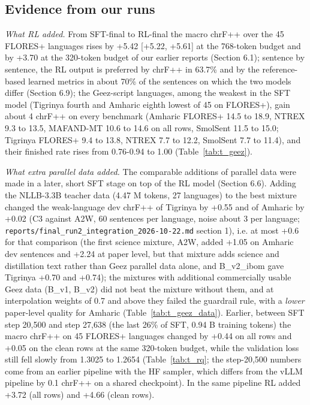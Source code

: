 \subsection{Evidence from our runs}\label{evidence-from-our-runs}

\emph{What RL added.} From SFT-final to RL-final the macro chrF++ over the 45 FLORES+ languages rises by +5.42 {[}+5.22, +5.61{]} at the 768-token budget and by +3.70 at the 320-token budget of our earlier reports (Section 6.1); sentence by sentence, the RL output is preferred by chrF++ in 63.7\% and by the reference-based learned metrics in about 70\% of the sentences on which the two models differ (Section 6.9); the Ge\textquotesingle ez-script languages, among the weakest in the SFT model (Tigrinya fourth and Amharic eighth lowest of 45 on FLORES+), gain about 4 chrF++ on every benchmark (Amharic FLORES+ 14.5 to 18.9, NTREX 9.3 to 13.5, MAFAND-MT 10.6 to 14.6 on all rows, SmolSent 11.5 to 15.0; Tigrinya FLORES+ 9.4 to 13.8, NTREX 7.7 to 12.2, SmolSent 7.7 to 11.4), and their finished rate rises from 0.76-0.94 to 1.00 (Table~\ref{tab:t_geez}).

\emph{What extra parallel data added.} The comparable additions of parallel data were made in a later, short SFT stage on top of the RL model (Section 6.6). Adding the NLLB-3.3B teacher data (4.47 M tokens, 27 languages) to the best mixture changed the weak-language dev chrF++ of Tigrinya by +0.55 and of Amharic by +0.02 (C3 against A2W, 60 sentences per language, noise about 3 per language; \texttt{reports/final\_run2\_integration\_2026-10-22.md} section 1), i.e. at most +0.6 for that comparison (the first science mixture, A2W, added +1.05 on Amharic dev sentences and +2.24 at paper level, but that mixture adds science and distillation text rather than Ge\textquotesingle ez parallel data alone, and B\_v2\_ibom gave Tigrinya +0.70 and +0.74); the mixtures with additional commercially usable Ge\textquotesingle ez data (B\_v1, B\_v2) did not beat the mixture without them, and at interpolation weights of 0.7 and above they failed the guardrail rule, with a \emph{lower} paper-level quality for Amharic (Table~\ref{tab:t_geez_data}). Earlier, between SFT step 20,500 and step 27,638 (the last 26\% of SFT, 0.94 B training tokens) the macro chrF++ on 45 FLORES+ languages changed by +0.44 on all rows and +0.05 on the clean rows at the same 320-token budget, while the validation loss still fell slowly from 1.3025 to 1.2654 (Table~\ref{tab:t_rq}; the step-20,500 numbers come from an earlier pipeline with the HF sampler, which differs from the vLLM pipeline by 0.1 chrF++ on a shared checkpoint). In the same pipeline RL added +3.72 (all rows) and +4.66 (clean rows).

